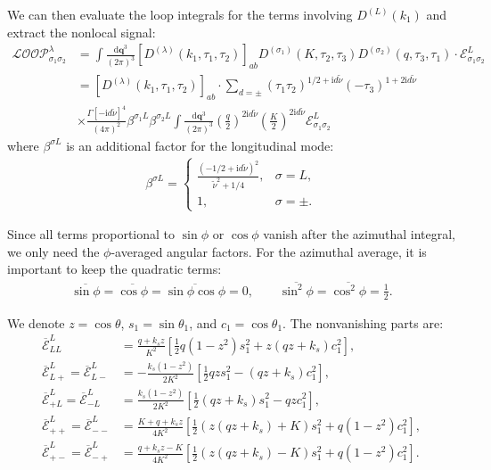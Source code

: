 \documentclass[a4paper,12pt]{article}
\def\di{{\mathrm{d}}}
\def\mb{\mathbf}
\def\ii{\mathrm{i}}
\def\be{\beta}
\def\si{\sigma}
\def\tn{\tilde\nu}
\begin{document}
We can then evaluate the loop integrals for the terms involving $D^{(L)}(k_1)$ and extract the nonlocal signal:
\begin{align}
    \mathcal{LOOP}_{\sigma_1\sigma_2}^{\lambda} &= \int \frac{\di \mb{q}^3}{(2\pi)^3} 
    [D^{(\lambda)}(k_1,\tau_1,\tau_2)]_{ab} 
    D^{(\sigma_1)}(K,\tau_2,\tau_3) 
    D^{(\sigma_2)}(q,\tau_3,\tau_1) 
    \cdot \mathcal{E}^L_{\si_1 \si_2} \\
    &= \left[D^{(\lambda)}(k_1,\tau_1,\tau_2)\right]_{ab}
    \cdot \sum_{d=\pm}
    (\tau_1\tau_2)^{1/2+\ii d\tn}(-\tau_3)^{1+2\ii d\tn} \nonumber \\
    &\times \frac{\Gamma[-\ii d \tn]^4}{(4\pi)^2} 
    \be^{\si_1L} \be^{\si_2L}
    \int \frac{\di \mb{q}^3}{(2\pi)^3}
    \left(\frac{q}{2}\right)^{2\ii d \tn}
    \left(\frac{K}{2}\right)^{2\ii d \tn}
    \mathcal{E}^L_{\si_1 \si_2}   
\end{align}
where $\beta^{\si L}$ is an additional factor for the longitudinal mode:
\begin{align}
    \beta^{\si L} = \begin{cases}
    \frac{(-1/2+\ii d\tn)^2}{\tn^2+1/4}, & \si=L, \\
    1, & \si=\pm.
    \end{cases}
\end{align}

Since all terms proportional to
$\sin\phi$ or $\cos\phi$ vanish after the azimuthal integral, we only need the $\phi$-averaged angular factors.
For the azimuthal average, it is important to keep the quadratic terms:
\begin{align}
    \overline{\sin\phi}=\overline{\cos\phi}
    =\overline{\sin\phi\cos\phi}=0,\qquad
    \overline{\sin^2\phi}=\overline{\cos^2\phi}=\frac{1}{2}.
\end{align}

We denote $z=\cos\theta$, $s_1=\sin\theta_1$, and $c_1=\cos\theta_1$. The nonvanishing parts are:
\begin{align}
    \overline{\mathcal{E}}_{LL}^L
    &= \frac{q+k_s z}{K^2}
    \left[\frac{1}{2}q(1-z^2)s_1^2+z(qz+k_s)c_1^2\right], \\
    \overline{\mathcal{E}}_{L+}^L
    =\overline{\mathcal{E}}_{L-}^L
    &= -\frac{k_s(1-z^2)}{2K^2}
    \left[\frac{1}{2}qzs_1^2-(qz+k_s)c_1^2\right], \\
    \overline{\mathcal{E}}_{+L}^L
    =\overline{\mathcal{E}}_{-L}^L
    &= \frac{k_s(1-z^2)}{2K^2}
    \left[\frac{1}{2}(qz+k_s)s_1^2-qzc_1^2\right], \\
    \overline{\mathcal{E}}_{++}^L
    =\overline{\mathcal{E}}_{--}^L
    &= \frac{K+q+k_s z}{4K^2}
    \left[\frac{1}{2}\left(z(qz+k_s)+K\right)s_1^2+q(1-z^2)c_1^2\right], \\
    \overline{\mathcal{E}}_{+-}^L
    =\overline{\mathcal{E}}_{-+}^L
    &= \frac{q+k_s z-K}{4K^2}
    \left[\frac{1}{2}\left(z(qz+k_s)-K\right)s_1^2+q(1-z^2)c_1^2\right].
\end{align}
\end{document}
